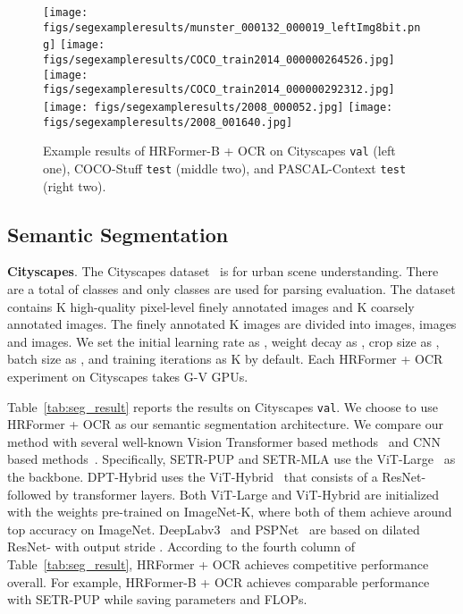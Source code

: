 \documentclass{article}
\begin{document}
\begin{figure*}[t]
  \centering
  \texttt{[image: figs/segexampleresults/munster\_000132\_000019\_leftImg8bit.png]}
  \texttt{[image: figs/segexampleresults/COCO\_train2014\_000000264526.jpg]}
  \texttt{[image: figs/segexampleresults/COCO\_train2014\_000000292312.jpg]}
  \texttt{[image: figs/segexampleresults/2008\_000052.jpg]}
  \texttt{[image: figs/segexampleresults/2008\_001640.jpg]}
  \caption{Example results of HRFormer-B + OCR on
      {Cityscapes \texttt{val} (left one), COCO-Stuff \texttt{test} (middle two), and PASCAL-Context \texttt{test} (right two).}}
  \label{fig:seg_result_example}
  \vspace{-.2cm}
\end{figure*}


\subsection{Semantic Segmentation}

\vspace{1mm}
\noindent\textbf{Cityscapes}.
The Cityscapes dataset~\cite{cordts2016cityscapes} is for urban scene understanding.
There are a total of
 classes
and only  classes are used for parsing evaluation.
The dataset contains K high-quality pixel-level finely annotated images and K coarsely annotated images. The finely annotated K images are divided into   images,   images and   images.
We set the initial learning rate as , weight decay as , crop size as , batch size as , and training iterations as K by default.
Each HRFormer + OCR experiment on Cityscapes takes  G-V GPUs.

Table~\ref{tab:seg_result} reports the results on Cityscapes \texttt{val}.
We choose to use HRFormer + OCR as our semantic segmentation architecture.
We compare our method with several well-known Vision Transformer based methods~\cite{SETR,Ranftl2021} and CNN based methods~\cite{chen2017deeplab,zhao2017pyramid,yuan2019object}.
Specifically,
SETR-PUP and SETR-MLA use the ViT-Large~\cite{dosovitskiy2020image} as the backbone.
DPT-Hybrid uses the ViT-Hybrid~\cite{dosovitskiy2020image} that consists of a ResNet- followed by  transformer layers.
Both ViT-Large and ViT-Hybrid are initialized with the weights pre-trained on ImageNet-K,
where both of them achieve around  top accuracy on ImageNet.
DeepLabv3~\cite{chen2017deeplab} and PSPNet~\cite{zhao2017pyramid} are based on dilated ResNet- with output stride .
According to the fourth column of Table~\ref{tab:seg_result},
HRFormer + OCR achieves competitive performance overall.
For example,
HRFormer-B + OCR achieves comparable performance with SETR-PUP while saving  parameters
and  FLOPs.
\end{document}
